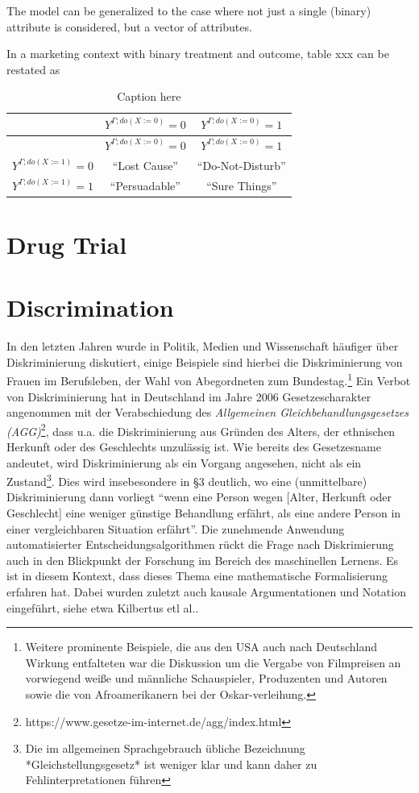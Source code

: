 \documentclass[
]{book}
\theoremstyle{definition}
\theoremstyle{definition}
\theoremstyle{definition}
\theoremstyle{remark}
\begin{document}
The model can be generalized to the case where not just a single (binary) attribute is considered, but a vector of attributes.

In a marketing context with binary treatment and outcome, table xxx can be restated as

\begin{longtable}[]{@{}rcc@{}}
\caption{\label{tab:simple-table} Caption here}\tabularnewline
\toprule
& \(Y^{\Gamma;do(X:=0)} = 0\) & \(Y^{\Gamma;do(X:=0)} = 1\)\tabularnewline
\midrule
\endfirsthead
\toprule
& \(Y^{\Gamma;do(X:=0)} = 0\) & \(Y^{\Gamma;do(X:=0)} = 1\)\tabularnewline
\midrule
\endhead
\(Y^{\Gamma;do(X:=1)} = 0\) & ``Lost Cause'' & ``Do-Not-Disturb''\tabularnewline
\(Y^{\Gamma;do(X:=1)} = 1\) & ``Persuadable'' & ``Sure Things''\tabularnewline
\bottomrule
\end{longtable}

\hypertarget{drug-trial}{%
\section{Drug Trial}\label{drug-trial}}

\hypertarget{discrimination}{%
\section{Discrimination}\label{discrimination}}

In den letzten Jahren wurde in Politik, Medien und Wissenschaft häufiger über Diskriminierung diskutiert, einige Beispiele sind hierbei die Diskriminierung von Frauen im Berufsleben, der Wahl von Abegordneten zum Bundestag.\footnote{Weitere prominente Beispiele, die aus den USA auch nach Deutschland Wirkung entfalteten war die Diskussion um die Vergabe von Filmpreisen an vorwiegend weiße und männliche Schauspieler, Produzenten und Autoren sowie die  von Afroamerikanern bei der Oskar-verleihung.} Ein Verbot von Diskriminierung hat in Deutschland im Jahre 2006 Gesetzescharakter angenommen mit der Verabschiedung des \emph{Allgemeinen Gleichbehandlungsgesetzes (AGG)}\footnote{https://www.gesetze-im-internet.de/agg/index.html}, dass u.a. die Diskriminierung aus Gründen des Alters, der ethnischen Herkunft oder des Geschlechts unzulässig ist. Wie bereits des Gesetzesname andeutet, wird Diskriminierung als ein Vorgang angesehen, nicht als ein Zustand\footnote{Die im allgemeinen Sprachgebrauch übliche Bezeichnung *Gleichstellungsgesetz* ist weniger klar und kann daher zu Fehlinterpretationen führen}. Dies wird insebesondere in §3 deutlich, wo eine (unmittelbare) Diskriminierung dann vorliegt ``wenn eine Person wegen {[}Alter, Herkunft oder Geschlecht{]} eine weniger günstige Behandlung erfährt, als eine andere Person in einer vergleichbaren Situation erfährt''.
Die zunehmende Anwendung automatisierter Entscheidungsalgorithmen rückt die Frage nach Diskrimierung auch in den Blickpunkt der Forschung im Bereich des maschinellen Lernens. Es ist in diesem Kontext, dass dieses Thema eine mathematische Formalisierung erfahren hat. Dabei wurden zuletzt auch kausale Argumentationen und Notation eingeführt, siehe etwa Kilbertus etl al..
\end{document}
